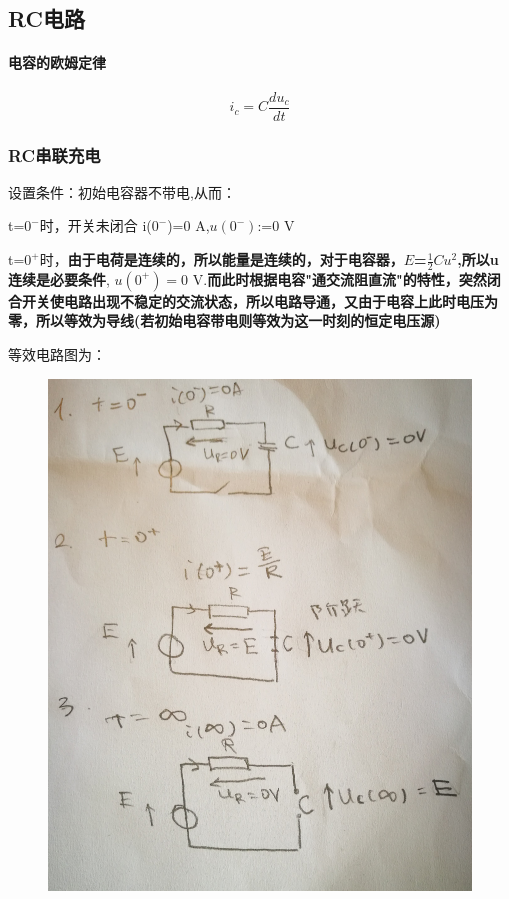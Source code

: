 \documentclass[12pt]{book}
\theoremstyle{definition}\newtheorem{dfn}{Définition}[chapter]
\theoremstyle{plain}\newtheorem{thm}{Théorème}[chapter]
\theoremstyle{plain}\newtheorem{prp}{Proposition}[chapter]
\theoremstyle{plain}\newtheorem{lem}{\bf Lemme}[chapter]
\theoremstyle{plain}\newtheorem{axm}{\bf Axiome}[chapter]
\theoremstyle{plain}\newtheorem{lmm}{\bf Lemme}[chapter]
\theoremstyle{plain}\newtheorem{cor}{\bf Corollaire}[chapter]
\theoremstyle{remark}\newtheorem{rem}{Remarque}[chapter]
\begin{document}
\subsection{RC电路}
\paragraph{电容的欧姆定律}
$$
i_c=C\frac{du_c}{dt}
$$



\subsubsection{RC串联充电}
设置条件：初始电容器不带电,从而：

t=$0^-$时，开关未闭合 i($0^-$)=0 A,$u(0^-)$:=0 V

t=$0^+$时，\textbf{由于电荷是连续的，所以能量是连续的，对于电容器，$\mathit{E}$=$\frac{1}{2}Cu^2$,所以u连续是必要条件},
$u(0^+)=0$ V.\textbf{而此时根据电容"通交流阻直流"的特性，突然闭合开关使电路出现不稳定的交流状态，所以电路导通，又由于电容上此时电压为零，所以等效为导线(若初始电容带电则等效为这一时刻的恒定电压源)}

等效电路图为：
\begin{figure}[H]
	\centering
	\includegraphics[scale=0.2]{image//Circuit lineaire du premier ordre//2}
\end{figure}
\end{document}
